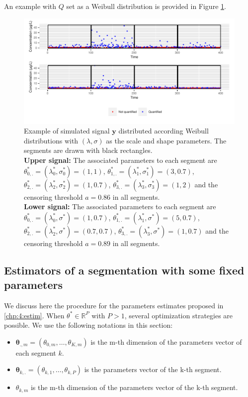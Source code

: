 An example with $Q$ set as a Weibull distribution is provided in Figure \ref{fig:param_ex}. 
\begin{figure}[ht]
    \centering
    \includegraphics{figs/Chap4/param_ex.pdf}
    \caption{Example of simulated signal $\bm y$ distributed according Weibull distributions with $(\lambda,\sigma)$ as the scale and shape parameters. The segments are drawn with black rectangles. \\ 
\textbf{Upper signal:} The associated parameters to each segment are $\theta^*_{0,.} = (\lambda^*_0,\sigma^*_0) = (1,1)$, $\theta^*_{1,.} = (\lambda^*_1,\sigma^*_1) = (3,0.7)$, $\theta^*_{2,.} = (\lambda^*_2,\sigma^*_2) = (1,0.7)$, $\theta^*_{3,.} = (\lambda^*_3,\sigma^*_3) = (1,2)$ and the censoring threshold $a = 0.86$ in all segments.\\
\textbf{Lower signal:} The associated parameters to each segment are $\theta^*_{0,.} = (\lambda^*_0,\sigma^*) = (1,0.7)$, $\theta^*_{1,.} = (\lambda^*_1,\sigma^*) = (5,0.7)$, $\theta^*_{2,.} = (\lambda^*_2,\sigma^*) = (0.7,0.7)$, $\theta^*_{3,.} = (\lambda^*_3,\sigma^*) = (1,0.7)$ and the censoring threshold $a = 0.89$ in all segments.}
    \label{fig:param_ex}
\end{figure}

\subsection{Estimators of a segmentation with some fixed parameters}

We discuss here the procedure for the parameters estimates proposed in \ref{chp:4:estim}. When $\theta^* \in \mathbb{R}^P$ with $P > 1$, several optimization strategies are possible. We use the following notations in this section: 
\begin{itemize}
\item $\bm \theta_{.,m} = (\theta_{0,m},\dots,\theta_{K,m})$ is the m-th dimension of the parameters vector of each segment $k$.
\item $\bm \theta_{k,.} = (\theta_{k,1},\dots,\theta_{k,P})$ is the parameters vector of the k-th segment.
\item $\theta_{k,m}$ is the m-th dimension of the parameters vector of the k-th segment.
\end{itemize}


